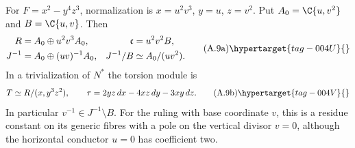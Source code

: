 \begin{proposition}\hypertarget{tag-01AJ}{}\label{cdp:st:A.2.5}

For $F=x^2-y^4z^3$, normalization is $x=u^2v^3$, $y=u$, $z=v^2$. Put $A_0=\C\{u,v^2\}$ and $B=\C\{u,v\}$. Then
\[
 \begin{aligned}
 R&=A_0\oplus u^2v^3A_0,&\mathfrak c&=u^2v^2B,\\
 J^{-1}&=A_0\oplus(uv)^{-1}A_0,&
 J^{-1}/B&\simeq A_0/(uv^2).
 \end{aligned}
 \tag{A.9a}\hypertarget{tag-004U}{}\label{cdp:eq:A.9a}
\]
In a trivialization of $N^*$ the torsion module is
\[
 T\simeq R/(x,y^3z^2),\qquad
 \tau=2yz\,dx-4xz\,dy-3xy\,dz.
 \tag{A.9b}\hypertarget{tag-004V}{}\label{cdp:eq:A.9b}
\]
In particular $v^{-1}\in J^{-1}\setminus B$. For the ruling with base coordinate $v$, this is a residue constant on its generic fibres with a pole on the vertical divisor $v=0$, although the horizontal conductor $u=0$ has coefficient two.
\end{proposition}


